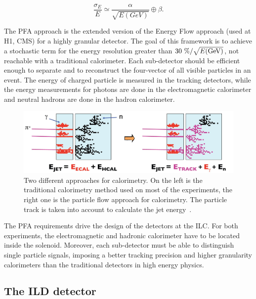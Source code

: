     \begin{equation}
      \frac{\sigma_E}{E} \simeq \frac{\alpha}{\sqrt{E(GeV)}} \oplus \beta.
      \label{eq:jet}
    \end{equation}

    The \gls{PFA} approach is the extended version of the Energy Flow approach (used at H1, CMS) for a highly granular detector. 
    The goal of this framework is to achieve a stochastic term for the energy resolution greater than $30~\% / \sqrt{E\rm{(GeV)}}$, not reachable with a traditional calorimeter.
    Each sub-detector should be efficient enough to separate and to reconstruct the four-vector of all visible particles in an event.
    The energy of charged particle is measured in the tracking detectors, while the energy measurements for photons are done in the electromagnetic calorimeter and neutral hadrons are done in the hadron calorimeter.
     
     \begin{figure}[!h]
      \centering
      \includegraphics[width = 15cm]{Pictures/ILC/physics.jpg}
      \caption{Two different approaches for calorimetry. On the left is the traditional calorimetry method used on most of the experiments, the right one is the particle flow approach for calorimetry. The particle track is taken into account to calculate the jet energy~\cite{PFA}.}
      \label{fig:jetEnergy}
    \end{figure}   
    
    The \gls{PFA} requirements drive the design of the detectors at the \gls{ILC}.
    For both experiments, the electromagnetic and hadronic calorimeter have to be located inside the solenoid.
    Moreover, each sub-detector must be able to distinguish single particle signals, imposing a better tracking precision and higher granularity calorimeters than the traditional detectors in high energy physics.

    \subsection{The ILD detector}
    \label{sec:ILD}
    
